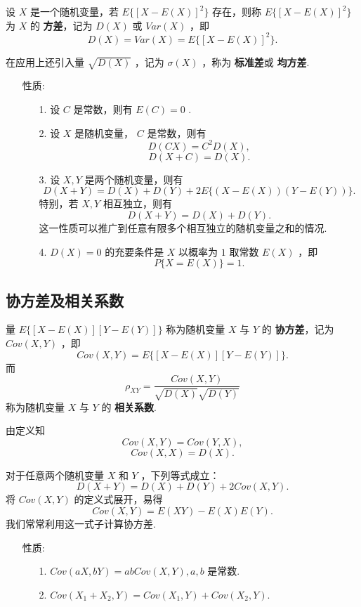 \documentclass[UTF8,10pt]{ctexart}
\begin{document}
	设 $ X $ 是一个随机变量，若 $ E\{[X-E(X)]^{2}\} $ 存在，则称 $ E\{[X-E(X)]^{2}\} $ 为 $ X $ 的 \textbf{方差}，记为 $ D(X) $ 或 $ Var(X) $ ，即 $$ D(X)=Var(X)=E\{[X-E(X)]^{2}\}. $$
	
	在应用上还引入量 $ \sqrt{D(X)} $ ，记为 $ \sigma(X) $ ，称为 \textbf{标准差}或 \textbf{均方差}.
	
	\begin{itemize}
		\item [性质:] {
			\begin{enumerate}
				\item [1.] 设 $ C $ 是常数，则有 $ E(C)=0 $ .
				\item [2.] 设 $ X $ 是随机变量， $ C $ 是常数，则有 $$ D(CX)=C^{2}D(X), $$ $$ D(X+C)=D(X). $$
				\item [3.] 设 $ X,Y $ 是两个随机变量，则有 $$ D(X+Y)=D(X)+D(Y)+2E\{(X-E(X))(Y-E(Y))\}. $$ 特别，若 $ X,Y $ 相互独立，则有 $$ D(X+Y)=D(X)+D(Y). $$ 这一性质可以推广到任意有限多个相互独立的随机变量之和的情况.
				\item [4.] $ D(X)=0 $ 的充要条件是 $ X $ 以概率为 $ 1 $ 取常数 $ E(X) $ ，即 $$ P\{X=E(X)\}=1. $$
			\end{enumerate}
		}
	\end{itemize}
	
	\subsection{协方差及相关系数}
	
	量 $ E\{[X-E(X)][Y-E(Y)]\} $ 称为随机变量 $ X $ 与 $ Y $ 的 \textbf{协方差}，记为 $ Cov(X,Y) $ ，即 $$ Cov(X,Y)=E\{[X-E(X)][Y-E(Y)]\}. $$ 而 $$ \rho _{XY}= \frac{Cov(X,Y)}{ \sqrt{D(X)} \sqrt{D(Y)} } $$ 称为随机变量 $ X $ 与 $ Y $ 的 \textbf{相关系数}.
	
	由定义知 $$ Cov(X,Y)=Cov(Y,X), $$ $$ Cov(X,X)=D(X). $$
	
	对于任意两个随机变量 $ X $ 和 $ Y $ ，下列等式成立： $$ D(X+Y)=D(X)+D(Y)+2Cov(X,Y). $$ 将 $ Cov(X,Y) $ 的定义式展开，易得 $$ Cov(X,Y)=E(XY)-E(X)E(Y). $$ 我们常常利用这一式子计算协方差.
	
	\begin{itemize}
		\item [性质:] {
			\begin{enumerate}
				\item [1.] $ Cov(aX,bY)=abCov(X,Y),a,b $ 是常数.
				\item [2.] $ Cov(X_{1}+X_{2},Y)=Cov(X_{1},Y)+Cov(X_{2},Y). $
			\end{enumerate}
		}
	\end{itemize}
\end{document}
